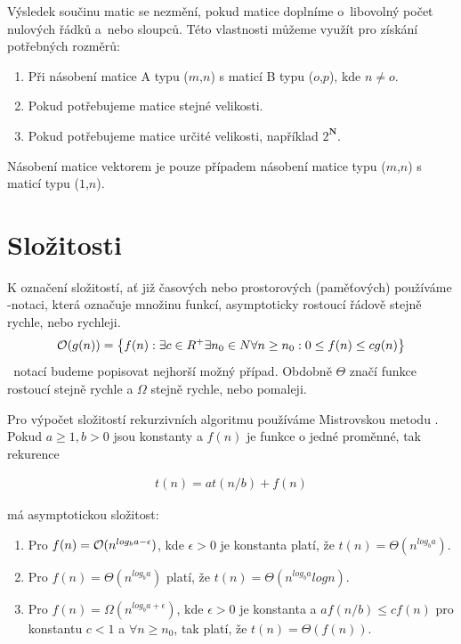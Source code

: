 Výsledek součinu matic se nezmění, pokud matice doplníme o~libovolný počet nulových řádků a~nebo sloupců. Této vlastnosti můžeme využít pro získání potřebných rozměrů:

\begin{enumerate}
  \item Při násobení matice A typu ($m$,$n$) s maticí B typu ($o$,$p$), kde $ n \neq o $.
  \item Pokud potřebujeme matice stejné velikosti.
  \item Pokud potřebujeme matice určité velikosti, například $ 2^{ \mathbf{N}} $.
\end{enumerate}

Násobení matice vektorem je pouze případem násobení matice typu ($m$,$n$) s maticí typu ($1$,$n$).

\section{Složitosti}

K označení složitostí, ať již časových nebo prostorových (paměťových) používáme \bigO-notaci, která označuje množinu funkcí, asymptoticky rostoucí řádově stejně rychle, nebo rychleji.
\begin{align}
\mathcal{O}(g(n)) = \left\{ f(n) : \exists c \in R^+ \exists n_0 \in N \forall n \geq n_0 : 0 \leq f(n) \leq cg(n) \right\}
\end{align}
\bigO\texttt{ }notací budeme popisovat nejhorší možný případ. Obdobně $\Theta$ značí funkce rostoucí stejně rychle a $\Omega$ stejně rychle, nebo pomaleji.


Pro výpočet složitostí rekurzivních algoritmu používáme Mistrovskou metodu \cite{Cormen:2001:IA:580470}. Pokud $a \geq 1, b > 0$ jsou konstanty a $f(n)$ je funkce o jedné proměnné, tak rekurence

\begin{align}
t(n) = at(n/b)+f(n)
\end{align}

má asymptotickou složitost:

\begin{enumerate}
  \item Pro $f(n) = \mathcal{O}(n^{log_b{a - \epsilon}})$, kde $\epsilon > 0$ je konstanta platí, že $t(n)=\Theta(n^{log_b{a}})$.
  \item Pro $f(n) = \Theta(n^{log_b{a}})$ platí, že $t(n)=\Theta(n^{log_b{a}}log{n})$.
  \item Pro $f(n) = \Omega(n^{log_b{a + \epsilon}})$, kde $\epsilon > 0$ je konstanta a $af(n/b) \leq cf(n)$ pro konstantu $c < 1$ a $\forall n\geq n_0$, tak platí, že $t(n)=\Theta(f(n))$.
\end{enumerate}

